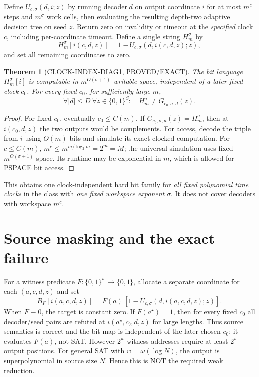 \documentclass[11pt]{article}
\newtheorem{theorem}{Theorem}
\begin{document}
Define \(U_{c,\sigma}(d,i;z)\) by running decoder \(d\)
on output coordinate \(i\) for at most \(m^c\) steps
and \(m^\sigma\) work cells, then evaluating the resulting
depth-two adaptive decision tree on seed \(z\).
Return zero on invalidity or timeout at the \emph{specified}
clock \(c\), including per-coordinate timeout.
Define a single string \(H_m^\sigma\) by
\[
 H_m^\sigma[i(c,d,z)]
 =1-U_{c,\sigma}(d,i(c,d,z);z),
\]
and set all remaining coordinates to zero.

\begin{theorem}[CLOCK-INDEX-DIAG1, PROVED/EXACT]
The bit language \(H_m^\sigma[i]\) is computable in
\(m^{O(\sigma+1)}\) writable space, independent of
a later fixed clock \(c_0\).
For every fixed \(c_0\), for sufficiently large \(m\),
\[
\forall |d|\le D\ \forall z\in\{0,1\}^S:
\quad H_m^\sigma\ne G_{c_0,\sigma,d}(z).
\]
\end{theorem}
\begin{proof}
For fixed \(c_0\), eventually \(c_0\le C(m)\).
If \(G_{c_0,\sigma,d}(z)=H_m^\sigma\), then at
\(i(c_0,d,z)\) the two outputs would be complements.
For access, decode the triple from \(i\) using \(O(m)\)
bits and simulate its exact clocked computation.
For \(c\le C(m)\),
\(m^c\le m^{m/\log_2m}=2^m=M\);
the universal simulation uses fixed
\(m^{O(\sigma+1)}\) space. Its runtime may be exponential
in \(m\), which is allowed for PSPACE bit access.
\end{proof}

This obtains one clock-independent hard bit family for
\emph{all fixed polynomial time clocks} in the class with
\emph{one fixed workspace exponent} \(\sigma\).
It does not cover decoders with workspace \(m^c\).

\section{Source masking and the exact failure}
For a witness predicate \(F:\{0,1\}^w\to\{0,1\}\),
allocate a separate coordinate for each
\((a,c,d,z)\) and set
\[
 B_F[i(a,c,d,z)]
 =F(a)\,[1-U_{c,\sigma}(d,i(a,c,d,z);z)].
\]
When \(F\equiv0\), the target is constant zero.
If \(F(a^\star)=1\), then for every fixed
\(c_0\) all decoder/seed pairs are refuted at
\(i(a^\star,c_0,d,z)\) for large lengths.
Thus source semantics is correct and the bit
map is independent of the later chosen \(c_0\);
it evaluates \(F(a)\), not SAT.
However \(2^w\) witness addresses require
at least \(2^w\) output positions.
For general SAT with \(w=\omega(\log N)\),
the output is superpolynomial in source size \(N\).
Hence this is NOT the required weak reduction.
\end{document}
